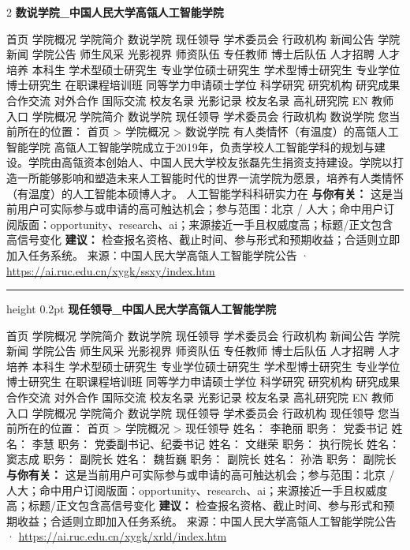 \documentclass[10.5pt]{ctexart}
\begin{document}
\begin{multicols}{2}
{\large\bfseries 数说学院\_中国人民大学高瓴人工智能学院}\par
首页 学院概况 学院简介 数说学院 现任领导 学术委员会 行政机构 新闻公告 学院新闻 学院公告 师生风采 光影视界 师资队伍 专任教师 博士后队伍 人才招聘 人才培养 本科生 学术型硕士研究生 专业学位硕士研究生 学术型博士研究生 专业学位博士研究生 在职课程培训班 同等学力申请硕士学位 科学研究 研究机构 研究成果 合作交流 对外合作 国际交流 校友名录 光影记录 校友名录 高礼研究院 EN 教师入口 学院概况 学院简介 数说学院 现任领导 学术委员会 行政机构 数说学院 您当前所在的位置： 首页 > 学院概况 > 数说学院 有人类情怀（有温度）的高瓴人工智能学院 高瓴人工智能学院成立于2019年，负责学校人工智能学科的规划与建设。学院由高瓴资本创始人、中国人民大学校友张磊先生捐资支持建设。学院以打造一所能够影响和塑造未来人工智能时代的世界一流学院为愿景，培养有人类情怀（有温度）的人工智能本硕博人才。 人工智能学科科研实力在
\textbf{与你有关：} 这是当前用户可实际参与或申请的高可触达机会；参与范围：北京 / 人大；命中用户订阅版面：opportunity、research、ai；来源接近一手且权威度高；标题/正文包含高信号变化
\textbf{建议：} 检查报名资格、截止时间、参与形式和预期收益；合适则立即加入任务系统。
{\footnotesize\color{ormuted} 来源：中国人民大学高瓴人工智能学院公告 · \url{https://ai.ruc.edu.cn/xygk/ssxy/index.htm}}
\vspace{2mm}
\hrule height 0.2pt
\vspace{2mm}
{\large\bfseries 现任领导\_中国人民大学高瓴人工智能学院}\par
首页 学院概况 学院简介 数说学院 现任领导 学术委员会 行政机构 新闻公告 学院新闻 学院公告 师生风采 光影视界 师资队伍 专任教师 博士后队伍 人才招聘 人才培养 本科生 学术型硕士研究生 专业学位硕士研究生 学术型博士研究生 专业学位博士研究生 在职课程培训班 同等学力申请硕士学位 科学研究 研究机构 研究成果 合作交流 对外合作 国际交流 校友名录 光影记录 校友名录 高礼研究院 EN 教师入口 学院概况 学院简介 数说学院 现任领导 学术委员会 行政机构 现任领导 您当前所在的位置： 首页 > 学院概况 > 现任领导 姓名： 李艳丽 职务： 党委书记 姓名： 李慧 职务： 党委副书记、纪委书记 姓名： 文继荣 职务： 执行院长 姓名： 窦志成 职务： 副院长 姓名： 魏哲巍 职务： 副院长 姓名： 孙浩 职务： 副院长
\textbf{与你有关：} 这是当前用户可实际参与或申请的高可触达机会；参与范围：北京 / 人大；命中用户订阅版面：opportunity、research、ai；来源接近一手且权威度高；标题/正文包含高信号变化
\textbf{建议：} 检查报名资格、截止时间、参与形式和预期收益；合适则立即加入任务系统。
{\footnotesize\color{ormuted} 来源：中国人民大学高瓴人工智能学院公告 · \url{https://ai.ruc.edu.cn/xygk/xrld/index.htm}}

\end{multicols}
\end{document}
